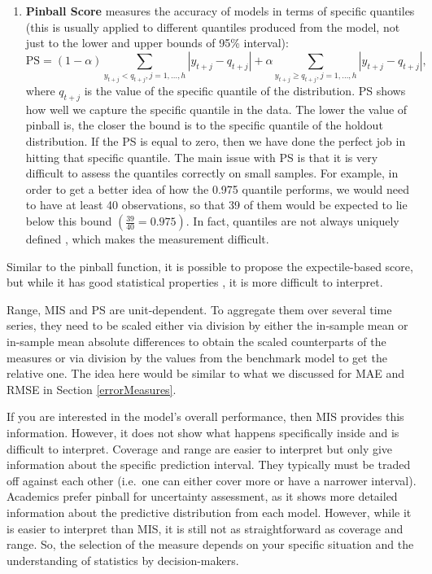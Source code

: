 \documentclass[
]{book}
\theoremstyle{definition}
\theoremstyle{definition}
\theoremstyle{definition}
\theoremstyle{definition}
\theoremstyle{remark}
\begin{document}
\begin{enumerate}
\item
  \textbf{Pinball Score} \citep{Koenker1978} measures the accuracy of models in terms of specific quantiles (this is usually applied to different quantiles produced from the model, not just to the lower and upper bounds of 95\% interval):
  \begin{equation}
   \mathrm{PS} = (1 -\alpha) \sum_{y_{t+j} < q_{t+j}, j=1,\dots,h } |y_{t+j} -q_{t+j}| + \alpha \sum_{y_{t+j} \geq q_{t+j} , j=1,\dots,h } |y_{t+j} -q_{t+j}|,
   \label{eq:pinball}
  \end{equation}
  where \(q_{t+j}\) is the value of the specific quantile of the distribution. PS shows how well we capture the specific quantile in the data. The lower the value of pinball is, the closer the bound is to the specific quantile of the holdout distribution. If the PS is equal to zero, then we have done the perfect job in hitting that specific quantile. The main issue with PS is that it is very difficult to assess the quantiles correctly on small samples. For example, in order to get a better idea of how the 0.975 quantile performs, we would need to have at least 40 observations, so that 39 of them would be expected to lie below this bound \(\left(\frac{39}{40} = 0.975\right)\). In fact, quantiles are not always uniquely defined \citep[see, for example,][]{Taylor2020}, which makes the measurement difficult.
\end{enumerate}

Similar to the pinball function, it is possible to propose the expectile-based score, but while it has good statistical properties \citep{Taylor2020}, it is more difficult to interpret.

Range, MIS and PS are unit-dependent. To aggregate them over several time series, they need to be scaled either via division by either the in-sample mean or in-sample mean absolute differences to obtain the scaled counterparts of the measures or via division by the values from the benchmark model to get the relative one. The idea here would be similar to what we discussed for MAE and RMSE in Section \ref{errorMeasures}.

If you are interested in the model's overall performance, then MIS provides this information. However, it does not show what happens specifically inside and is difficult to interpret. Coverage and range are easier to interpret but only give information about the specific prediction interval. They typically must be traded off against each other (i.e.~one can either cover more or have a narrower interval). Academics prefer pinball for uncertainty assessment, as it shows more detailed information about the predictive distribution from each model. However, while it is easier to interpret than MIS, it is still not as straightforward as coverage and range. So, the selection of the measure depends on your specific situation and the understanding of statistics by decision-makers.
\end{document}
